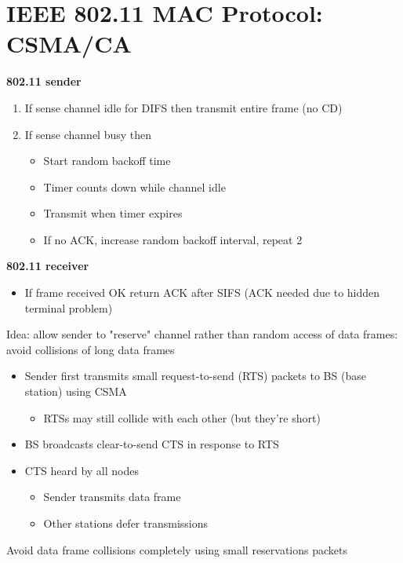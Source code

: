 \documentclass{article}[18pt]
\begin{document}
\section{IEEE 802.11 MAC Protocol: CSMA/CA}
\textbf{802.11 sender}
\begin{enumerate}
	\item If sense channel idle for DIFS then transmit entire frame (no CD)
	\item If sense channel busy then
	\begin{itemize}
		\item Start random backoff time
		\item Timer counts down while channel idle
		\item Transmit when timer expires
		\item If no ACK, increase random backoff interval, repeat 2
	\end{itemize}
\end{enumerate}
\textbf{802.11 receiver}
\begin{itemize}
	\item If frame received OK return ACK after SIFS (ACK needed due to hidden terminal problem)
\end{itemize}
Idea: allow sender to "reserve" channel rather than random access of data frames: avoid collisions of long data frames
\begin{itemize}
	\item Sender first transmits small request-to-send (RTS) packets to BS (base station) using CSMA
	\begin{itemize}
		\item RTSs may still collide with each other (but they're short)
	\end{itemize}
	\item BS broadcasts clear-to-send CTS in response to RTS
	\item CTS heard by all nodes
	\begin{itemize}
		\item Sender transmits data frame
		\item Other stations defer transmissions
	\end{itemize}
\end{itemize}
\begin{important}[Collisions]
Avoid data frame collisions completely using small reservations packets
\end{important}
\end{document}
